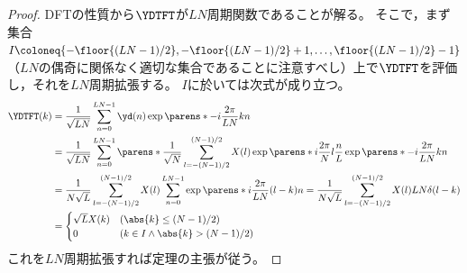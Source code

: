             \begin{proof}
                DFTの性質から$\YDTFT$が$LN$周期関数であることが解る。\newline
                そこで，まず集合$I\coloneq\{-\floor{(LN-1)/2},-\floor{(LN-1)/2}+1,\dots,\floor{(LN-1)/2}-1\}$（$LN$の偶奇に関係なく適切な集合であることに注意すべし）上で$\YDTFT$を評価し，それを$LN$周期拡張する。
                $I$に於いては次式が成り立つ。
                \begin{align*}
                    \YDTFT(k) &= \frac{1}{\sqrt{LN}}\sum_{n=0}^{LN-1}\yd(n)\exp\parens*{-i\frac{2\pi}{LN}kn} \\
                    &= \frac{1}{\sqrt{LN}}\sum_{n=0}^{LN-1}\parens*{\frac{1}{\sqrt{N}}\sum_{l=-(N-1)/2}^{(N-1)/2}X(l)\exp\parens*{i\frac{2\pi}{N}l\frac{n}{L}}}\exp\parens*{-i\frac{2\pi}{LN}kn} \\
                    &= \frac{1}{N\sqrt{L}}\sum_{l=-(N-1)/2}^{(N-1)/2}X(l)\sum_{n=0}^{LN-1}\exp\parens*{i\frac{2\pi}{LN}(l-k)n} = \frac{1}{N\sqrt{L}}\sum_{l=-(N-1)/2}^{(N-1)/2}X(l)LN\delta(l-k) \\
                    &= \begin{cases}
                        \sqrt{L}X(k) & (\abs{k}\leq (N-1)/2) \\
                        0 & (k\in I\land\abs{k}>(N-1)/2)
                    \end{cases}
                \end{align*}
                これを$LN$周期拡張すれば定理の主張が従う。
            \end{proof}
